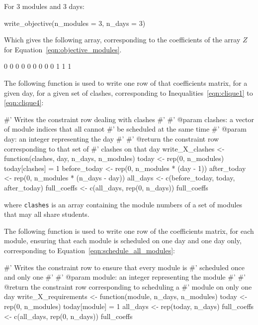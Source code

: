 For 3 modules and 3 days:

\begin{Rin-no-test}
write_objective(n_modules = 3, n_days = 3)
\end{Rin-no-test}

Which gives the following array, corresponding to the coefficients of the
array \(Z\) for Equation~\ref{eqn:objective_modules}.

\begin{Rout-no-test}
[1] 0 0 0 0 0 0 0 0 0 1 1 1
\end{Rout-no-test}

The following function is used to write one row of that coefficients matrix, for
a given day, for a given set of clashes, corresponding to
Inequalities~\ref{eqn:clique1} to \ref{eqn:clique4}:

\begin{Rin-no-test}
#' Writes the constraint row dealing with clashes
#'
#' @param clashes: a vector of module indices that all cannot
#'                 be scheduled at the same time
#' @param day: an integer representing the day
#'
#' @return the constraint row corresponding to that set of
#'         clashes on that day
write_X_clashes <- function(clashes, day, n_days, n_modules){
  today <- rep(0, n_modules)
  today[clashes] = 1
  before_today <- rep(0, n_modules * (day - 1))
  after_today <- rep(0, n_modules * (n_days - day))
  all_days <- c(before_today, today, after_today)
  full_coeffs <- c(all_days, rep(0, n_days))
  full_coeffs
}
\end{Rin-no-test}

where \texttt{clashes} is an array containing the module numbers of a set
of modules that may all share students.

The following function is used to write one row of the coefficients matrix, for
each module, ensuring that each module is scheduled on one day and one day only,
corresponding to Equation~\ref{eqn:schedule_all_modules}:

\begin{Rin-no-test}
#' Writes the constraint row to ensure that every module is
#' scheduled once and only one
#'
#' @param module: an integer representing the module
#'
#' @return the constraint row corresponding to scheduling a
#'         module on only one day
write_X_requirements <- function(module, n_days, n_modules){
  today <- rep(0, n_modules)
  today[module] = 1
  all_days <- rep(today, n_days)
  full_coeffs <- c(all_days, rep(0, n_days))
  full_coeffs
}
\end{Rin-no-test}

